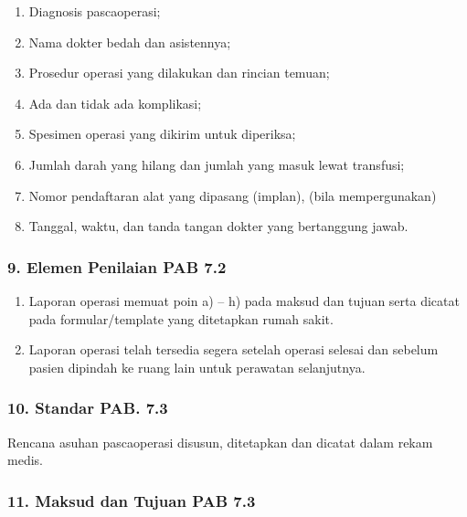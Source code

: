\documentclass[
]{book}
\providecommand{\tightlist}{%
  \setlength{\itemsep}{0pt}\setlength{\parskip}{0pt}}
\begin{document}
\begin{enumerate}
\def\labelenumi{\alph{enumi}.}
\tightlist
\item
  Diagnosis pascaoperasi;
\item
  Nama dokter bedah dan asistennya;
\item
  Prosedur operasi yang dilakukan dan rincian temuan;
\item
  Ada dan tidak ada komplikasi;
\item
  Spesimen operasi yang dikirim untuk diperiksa;
\item
  Jumlah darah yang hilang dan jumlah yang masuk lewat transfusi;
\item
  Nomor pendaftaran alat yang dipasang (implan), (bila mempergunakan)
\item
  Tanggal, waktu, dan tanda tangan dokter yang bertanggung jawab.
\end{enumerate}

\hypertarget{elemen-penilaian-pab-7.2}{%
\subsubsection*{9. Elemen Penilaian PAB 7.2}\label{elemen-penilaian-pab-7.2}}

\begin{enumerate}
\def\labelenumi{\alph{enumi}.}
\tightlist
\item
  Laporan operasi memuat poin a) -- h) pada maksud dan tujuan serta dicatat pada formular/template yang ditetapkan rumah sakit.
\item
  Laporan operasi telah tersedia segera setelah operasi selesai dan sebelum pasien dipindah ke ruang lain untuk perawatan selanjutnya.
\end{enumerate}

\hypertarget{standar-pab.-7.3}{%
\subsubsection*{10. Standar PAB. 7.3}\label{standar-pab.-7.3}}

Rencana asuhan pascaoperasi disusun, ditetapkan dan dicatat dalam rekam medis.

\hypertarget{maksud-dan-tujuan-pab-7.3}{%
\subsubsection*{11. Maksud dan Tujuan PAB 7.3}\label{maksud-dan-tujuan-pab-7.3}}
\end{document}
